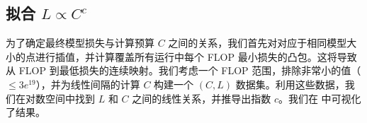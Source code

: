 \begin{table}[htb]
    \centering
    \setlength{\tabcolsep}{16pt}
    \renewcommand{\arraystretch}{1}
    \caption{\textbf{早期融合的缩放律参数。} 通过回归推导缩放律系数所得结果与使用闭式解所得结果非常接近。}
    \label{tab:scaling_laws_closed_form}
\end{table}
\subsection{拟合 \(L \propto C^c\)}
为了确定最终模型损失与计算预算 \(C\) 之间的关系，我们首先对对应于相同模型大小的点进行插值，并计算覆盖所有运行中每个 FLOP 最小损失的凸包。这将导致从 FLOP 到最低损失的连续映射。我们考虑一个 FLOP 范围，排除非常小的值（\(\leq 3e^{19}\)），并为线性间隔的计算 \(C\) 构建一个 \((C, L)\) 数据集。利用这些数据，我们在对数空间中找到 \(L\) 和 \(C\) 之间的线性关系，并推导出指数 \(c\)。我们在  中可视化了结果。

